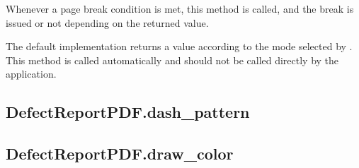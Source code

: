 \documentclass[letterpaper,10pt,english]{sphinxmanual}
\begin{document}
\begin{fulllineitems}
\begin{fulllineitems}
\label{\detokenize{generated/quality_assessment.quality_pdf_report.DefectReportPDF.accept_page_break:quality_assessment.quality_pdf_report.DefectReportPDF.accept_page_break}}
\sphinxAtStartPar
Whenever a page break condition is met, this method is called,
and the break is issued or not depending on the returned value.

\sphinxAtStartPar
The default implementation returns a value according to the mode selected by .
This method is called automatically and should not be called directly by the application.

\end{fulllineitems}



\subsection{DefectReportPDF.dash\_pattern}
\label{\detokenize{generated/quality_assessment.quality_pdf_report.DefectReportPDF.dash_pattern:defectreportpdf-dash-pattern}}\label{\detokenize{generated/quality_assessment.quality_pdf_report.DefectReportPDF.dash_pattern::doc}}

\begin{fulllineitems}
\label{\detokenize{generated/quality_assessment.quality_pdf_report.DefectReportPDF.dash_pattern:quality_assessment.quality_pdf_report.DefectReportPDF.dash_pattern}}
\end{fulllineitems}



\subsection{DefectReportPDF.draw\_color}
\label{\detokenize{generated/quality_assessment.quality_pdf_report.DefectReportPDF.draw_color:defectreportpdf-draw-color}}\label{\detokenize{generated/quality_assessment.quality_pdf_report.DefectReportPDF.draw_color::doc}}


\end{fulllineitems}
\end{document}
